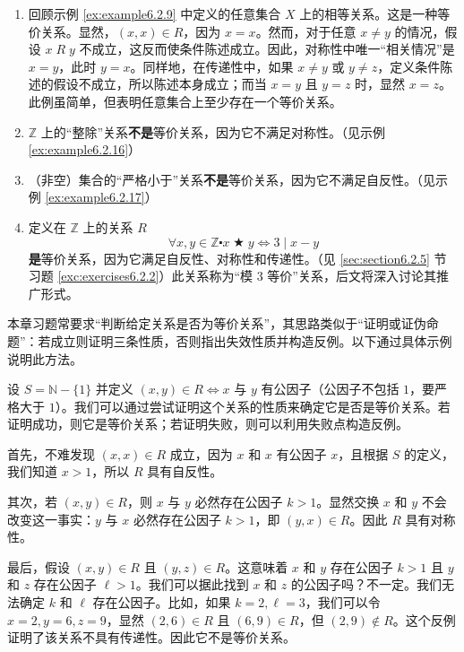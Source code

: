 \begin{example}
    \begin{enumerate}[label=(\arabic*)]
        \item 回顾示例 \ref{ex:example6.2.9} 中定义的任意集合 $X$ 上的相等关系。这是一种等价关系。显然，$(x, x) \in R$，因为 $x=x$。然而，对于任意 $x \ne y$ 的情况，假设 $x \;R\; y$ 不成立，这反而使条件陈述成立。因此，对称性中唯一``相关情况''是 $x=y$，此时 $y=x$。同样地，在传递性中，如果 $x \ne y$ 或 $y \ne z$，定义条件陈述的假设不成立，所以陈述本身成立；而当 $x = y$ 且 $y = z$ 时，显然 $x = z$。此例虽简单，但表明任意集合上至少存在一个等价关系。
        \item $\mathbb{Z}$ 上的``整除''关系\textbf{不是}等价关系，因为它不满足对称性。（见示例 \ref{ex:example6.2.16}）
        \item （非空）集合的``严格小于''关系\textbf{不是}等价关系，因为它不满足自反性。（见示例 \ref{ex:example6.2.17}）
        \item 定义在 $\mathbb{Z}$ 上的关系 $R$
        \[\forall x, y \in \mathbb{Z} \centerdot x \;\bigstar\; y \iff 3 \mid x - y\]
        \textbf{是}等价关系，因为它满足自反性、对称性和传递性。（见 \ref{sec:section6.2.5} 节习题 \ref{exc:exercises6.2.2}）此关系称为``模 $3$ 等价''关系，后文将深入讨论其推广形式。
    \end{enumerate}
\end{example}

本章习题常要求``判断给定关系是否为等价关系''，其思路类似于``证明或证伪命题''：若成立则证明三条性质，否则指出失效性质并构造反例。以下通过具体示例说明此方法。

\begin{example}
    设 $S=\mathbb{N}-\{1\}$ 并定义 $(x, y) \in R \iff x \text{\ 与\ } y \text{\ 有公因子}$（公因子不包括 $1$，要严格大于 $1$）。我们可以通过尝试证明这个关系的性质来确定它是否是等价关系。若证明成功，则它是等价关系；若证明失败，则可以利用失败点构造反例。

    首先，不难发现 $(x, x) \in R$ 成立，因为 $x$ 和 $x$ 有公因子 $x$，且根据 $S$ 的定义，我们知道 $x>1$，所以 $R$ 具有自反性。

    其次，若 $(x, y) \in R$，则 $x$ 与 $y$ 必然存在公因子 $k>1$。显然交换 $x$ 和 $y$ 不会改变这一事实：$y$ 与 $x$ 必然存在公因子 $k>1$，即 $(y,x) \in R$。因此 $R$ 具有对称性。

    最后，假设 $(x, y) \in R$ 且 $ (y,z) \in R$。这意味着 $x$ 和 $y$ 存在公因子 $k>1$ 且 $y$ 和 $z$ 存在公因子 $\ell>1$。我们可以据此找到 $x$ 和 $z$ 的公因子吗？不一定。我们无法确定 $k$ 和 $\ell$ 存在公因子。比如，如果 $k=2, \ell=3$，我们可以令 $x=2, y=6, z=9$，显然 $(2,6) \in R$ 且 $(6,9) \in R$，但 $(2,9) \notin R$。这个反例证明了该关系不具有传递性。因此它不是等价关系。
\end{example}

